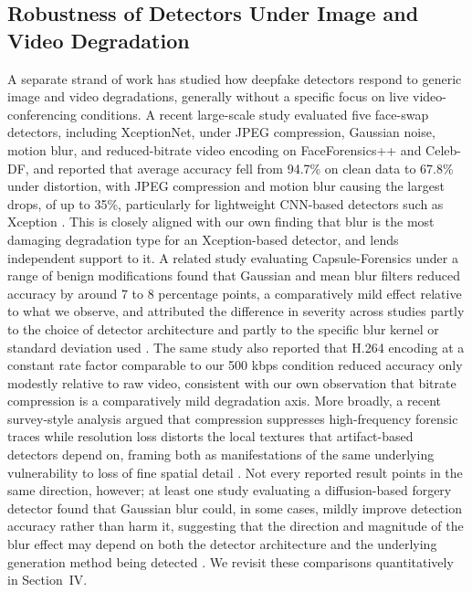 \documentclass[conference]{IEEEtran}
\begin{document}
\subsection{Robustness of Detectors Under Image and Video Degradation}
A separate strand of work has studied how deepfake detectors respond to generic image and video degradations, generally without a specific focus on live video-conferencing conditions. A recent large-scale study evaluated five face-swap detectors, including XceptionNet, under JPEG compression, Gaussian noise, motion blur, and reduced-bitrate video encoding on FaceForensics++ and Celeb-DF, and reported that average accuracy fell from 94.7\% on clean data to 67.8\% under distortion, with JPEG compression and motion blur causing the largest drops, of up to 35\%, particularly for lightweight CNN-based detectors such as Xception \cite{robustness2026}. This is closely aligned with our own finding that blur is the most damaging degradation type for an Xception-based detector, and lends independent support to it. A related study evaluating Capsule-Forensics under a range of benign modifications found that Gaussian and mean blur filters reduced accuracy by around 7 to 8 percentage points, a comparatively mild effect relative to what we observe, and attributed the difference in severity across studies partly to the choice of detector architecture and partly to the specific blur kernel or standard deviation used \cite{benignmods2021}. The same study also reported that H.264 encoding at a constant rate factor comparable to our 500 kbps condition reduced accuracy only modestly relative to raw video, consistent with our own observation that bitrate compression is a comparatively mild degradation axis. More broadly, a recent survey-style analysis argued that compression suppresses high-frequency forensic traces while resolution loss distorts the local textures that artifact-based detectors depend on, framing both as manifestations of the same underlying vulnerability to loss of fine spatial detail \cite{loger2026}. Not every reported result points in the same direction, however; at least one study evaluating a diffusion-based forgery detector found that Gaussian blur could, in some cases, mildly improve detection accuracy rather than harm it, suggesting that the direction and magnitude of the blur effect may depend on both the detector architecture and the underlying generation method being detected \cite{diffusionrobust2023}. We revisit these comparisons quantitatively in Section~IV.
\end{document}
